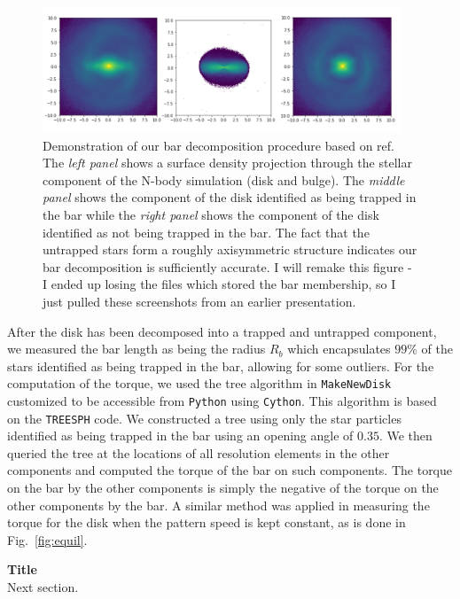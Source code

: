 \documentclass{natureprintstyle}
\begin{document}
\begin{figure}[h]%
\centering
\includegraphics[width=0.95\textwidth]{fig/fig-bar_decomp.pdf}
\caption{Demonstration of our bar decomposition procedure based on
ref.\cite{2016MNRAS.463.1952P} The \textit{left panel} shows a surface density
projection through the stellar component of the N-body simulation (disk and
bulge). The \textit{middle panel} shows the component of the disk identified
as being trapped in the bar while the \textit{right panel} shows the component
of the disk identified as not being trapped in the bar. The fact that the
untrapped stars form a roughly axisymmetric structure indicates our bar
decomposition is sufficiently accurate. {\color{red} I will remake this figure
- I ended up losing the files which stored the bar membership, so I just
pulled these screenshots from an earlier presentation.}}
\label{fig:decomp}
\end{figure}

After the disk has been decomposed into a trapped and untrapped component, we
measured the bar length as being the radius $R_b$ which encapsulates $99\%$ of
the stars identified as being trapped in the bar, allowing for some outliers.
For the computation of the torque, we used the tree algorithm in
\texttt{MakeNewDisk}\cite{2005MNRAS.361..776S} customized to be accessible
from \texttt{Python} using \texttt{Cython}. This algorithm is based on the
\texttt{TREESPH} code.\cite{1989ApJS...70..419H} We constructed a tree using
only the star particles identified as being trapped in the bar using an
opening angle of $0.35$. We then queried the tree at the locations of all
resolution elements in the other components and computed the torque of the bar
on such components. The torque on the bar by the other components is simply
the negative of the torque on the other components by the bar. A similar
method was applied in measuring the torque for the disk when the pattern speed
is kept constant, as is done in Fig.~\ref{fig:equil}.

\vspace{12pt}

\noindent
{\bf Title}
\\
\noindent
Next section.

% 
\end{document}
